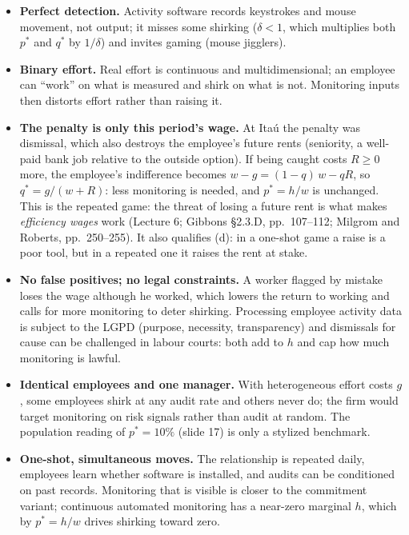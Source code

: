 \documentclass[11pt,a4paper]{article}
\begin{document}
\begin{itemize}
  \item \textbf{Perfect detection.} Activity software records keystrokes and mouse movement, not
        output; it misses some shirking ($\delta < 1$, which multiplies both $p^*$ and $q^*$ by
        $1/\delta$) and invites gaming (mouse jigglers).
  \item \textbf{Binary effort.} Real effort is continuous and multidimensional; an employee can
        ``work'' on what is measured and shirk on what is not. Monitoring inputs then distorts effort
        rather than raising it.
  \item \textbf{The penalty is only this period's wage.} At Itaú the penalty was dismissal, which
        also destroys the employee's future rents (seniority, a well-paid bank job relative to the
        outside option). If being caught costs $R \ge 0$ more, the employee's indifference becomes
        $w - g = (1 - q)\,w - q R$, so $q^* = g/(w + R)$: less monitoring is needed, and $p^* = h/w$
        is unchanged. This is the repeated game: the threat of losing a future rent is what makes
        \emph{efficiency wages} work (Lecture 6; Gibbons \S2.3.D, pp.~107--112; Milgrom and Roberts,
        pp.~250--255). It also qualifies (d): in a one-shot game a raise is a poor tool, but in a
        repeated one it raises the rent at stake.
  \item \textbf{No false positives; no legal constraints.} A worker flagged by mistake loses the
        wage although he worked, which lowers the return to working and calls for more monitoring
        to deter shirking. Processing employee activity data is subject to the LGPD (purpose,
        necessity, transparency) and dismissals for cause can be challenged in labour courts: both
        add to $h$ and cap how much monitoring is lawful.
  \item \textbf{Identical employees and one manager.} With heterogeneous effort costs $g$, some
        employees shirk at any audit rate and others never do; the firm would target monitoring on
        risk signals rather than audit at random. The population reading of $p^* = 10\%$ (slide 17)
        is only a stylized benchmark.
  \item \textbf{One-shot, simultaneous moves.} The relationship is repeated daily, employees learn
        whether software is installed, and audits can be conditioned on past records. Monitoring
        that is visible is closer to the commitment variant; continuous automated monitoring has a
        near-zero marginal $h$, which by $p^* = h/w$ drives shirking toward zero.
\end{itemize}
\end{document}
